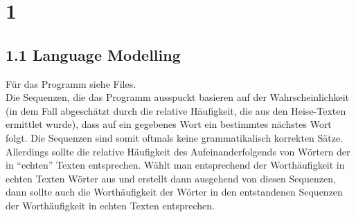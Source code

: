 \documentclass[a4paper,11pt,fleqn]{scrartcl}
\title{\titleinfo}
\author{\authorinfo}
\begin{document}
\maketitle
\notag

\section*{1}
\subsection*{1.1 Language Modelling}
Für das Programm siehe Files.\\
Die Sequenzen, die das Programm ausspuckt basieren auf der Wahrscheinlichkeit (in dem Fall abgeschätzt durch die relative Häufigkeit, die aus den Heise-Texten ermittlet wurde), dass auf ein gegebenes Wort ein bestimmtes nächstes Wort folgt. Die Sequenzen sind somit oftmals keine grammatikalisch korrekten Sätze. 
Allerdings sollte die relative Häufigkeit des Aufeinanderfolgends von Wörtern der in ``echten'' Texten entsprechen. Wählt man entsprechend der Worthäufigkeit in echten Texten Wörter aus und erstellt dann ausgehend von diesen Sequenzen, dann sollte auch die Worthäufigkeit der Wörter in den entstandenen Sequenzen der Worthäufigkeit in echten Texten entsprechen. 
\end{document}
